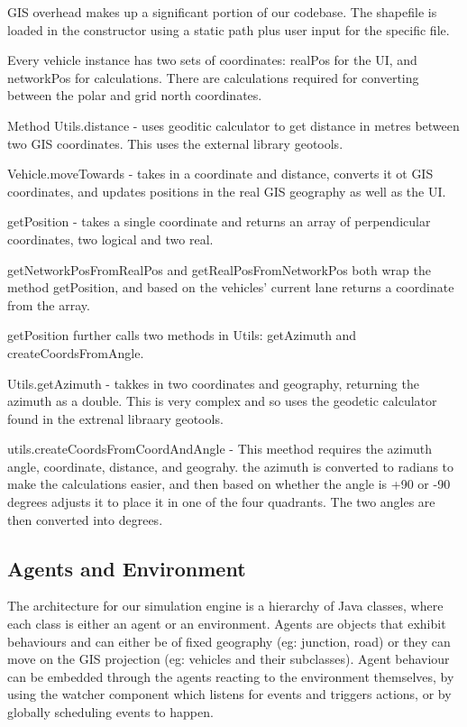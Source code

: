 \documentclass[11pt]{article}
\begin{document}
GIS overhead makes up a significant portion of our codebase. The shapefile is loaded in the constructor using a static path plus user input for the specific file. 

Every vehicle instance has two sets of coordinates: realPos for the UI, and networkPos for calculations. There are calculations required for converting between the polar and grid north coordinates. 

Method Utils.distance - uses geoditic calculator to get distance in metres between two GIS coordinates. This uses the external library geotools.

Vehicle.moveTowards - takes in a coordinate and distance, converts it ot GIS coordinates, and updates positions in the real GIS geography as well as the UI.

getPosition - takes a single coordinate and returns an array of perpendicular coordinates, two logical and two real.

getNetworkPosFromRealPos and getRealPosFromNetworkPos both wrap the method getPosition, and based on the vehicles' current lane returns a coordinate from the array.

getPosition further calls two methods in Utils: getAzimuth and createCoordsFromAngle.

Utils.getAzimuth - takkes in two coordinates and geography, returning the azimuth as a double. This is very complex and so uses the geodetic calculator found in the extrenal libraary geotools.

utils.createCoordsFromCoordAndAngle - This meethod requires the azimuth angle, coordinate, distance, and geograhy. the azimuth is converted to radians to make the calculations easier, and then based on whether the angle is +90 or -90 degrees adjusts it to place it in one of the four quadrants. The two angles are then converted into degrees.


\subsection{Agents and Environment}


The architecture for our simulation engine is a hierarchy of Java classes, where each class is either an agent or an environment. Agents are objects that exhibit behaviours and can either be of fixed geography (eg: junction, road) or they can move on the GIS projection (eg: vehicles and their subclasses). Agent behaviour can be embedded through the agents reacting to the environment themselves, by using the watcher component which listens for events and triggers actions, or by globally scheduling events to happen.
\end{document}
